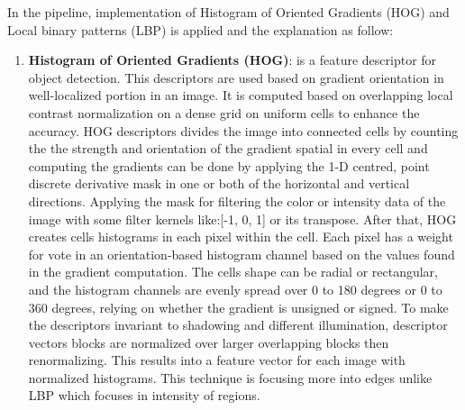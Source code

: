 In the pipeline, implementation of Histogram of Oriented Gradients (HOG) and Local binary patterns (LBP) is applied and the explanation as follow:
\begin{enumerate}
\item \textbf{Histogram of Oriented Gradients (HOG)}: is a feature descriptor for object detection.
This descriptors are used based on gradient orientation in well-localized portion in an image.
It is computed based on overlapping local contrast normalization on a dense grid on uniform cells to enhance the accuracy.
HOG descriptors divides the image into connected cells by counting the the strength and orientation of the gradient spatial in every cell and computing the gradients can be done by applying the 1-D centred, point discrete derivative mask in one or both of the horizontal and vertical directions.
Applying the mask for filtering the color or intensity data of the image with some filter kernels like:[-1, 0, 1] or its transpose.
After that, HOG creates cells histograms in each pixel within the cell.
Each pixel has a weight for vote in an orientation-based histogram channel based on the values found in the gradient computation.
The cells shape can be radial or rectangular, and the histogram channels are evenly spread over 0 to 180 degrees or 0 to 360 degrees, relying on whether the gradient is unsigned or signed. 
To make the descriptors invariant to shadowing and different illumination, descriptor vectors blocks are normalized over larger overlapping blocks then renormalizing.
This results into a feature vector for each image with normalized histograms.
This technique is focusing more into edges unlike LBP which focuses in intensity of regions.


\end{enumerate}
